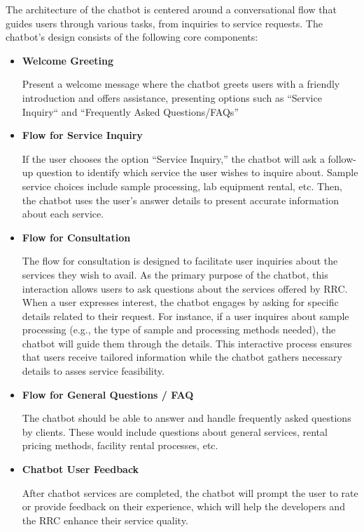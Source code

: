 The architecture of the chatbot is centered around a conversational flow that guides users through various tasks, from inquiries to service requests. The chatbot’s design consists of the following core components:

\begin{itemize}
	\item \textbf{Welcome Greeting}
	
	Present a welcome message where the chatbot greets users with a friendly introduction and offers assistance, presenting options such as “Service Inquiry“ and “Frequently Asked Questions/FAQs”
	
	\item \textbf{Flow for Service Inquiry}
	
	If the user chooses the option “Service Inquiry,” the chatbot will ask a follow-up question to identify which service the user wishes to inquire about. Sample service choices include sample processing,  lab equipment rental, etc. Then, the chatbot uses the user's answer details to present accurate information about each service. 
	
	\item \textbf{Flow for Consultation}
	
	The flow for consultation is designed to facilitate user inquiries about the services they wish to avail. As the primary purpose of the chatbot, this interaction allows users to ask questions about the services offered by RRC. When a user expresses interest, the chatbot engages by asking for specific details related to their request. For instance, if a user inquires about sample processing (e.g., the type of sample and processing methods needed), the chatbot will guide them through the details. This interactive process ensures that users receive tailored information while the chatbot gathers necessary details to asses service feasibility.
	
	\item \textbf{Flow for General Questions / FAQ}
	
	The chatbot should be able to answer and handle frequently asked questions by clients. These would include questions about general services, rental pricing methods, facility rental processes, etc.
	
	\item \textbf{Chatbot User Feedback}
	
	After chatbot services are completed, the chatbot will prompt the user to rate or provide feedback on their experience, which will help the developers and the RRC enhance their service quality.
	

\end{itemize}
